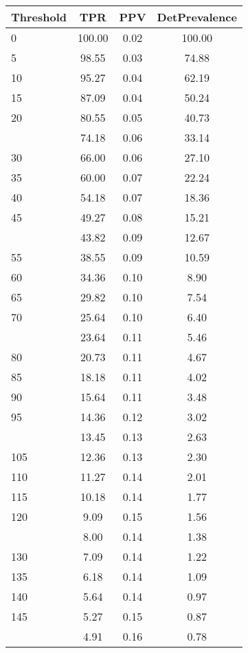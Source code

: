 \begin{table}[ht]
\centering
\begin{tabular}{lccc}
  \toprule
Threshold & TPR & PPV & DetPrevalence \\ 
  \midrule
0 & 100.00 & 0.02 & 100.00 \\ 
  5 & 98.55 & 0.03 & 74.88 \\ 
  10 & 95.27 & 0.04 & 62.19 \\ 
  15 & 87.09 & 0.04 & 50.24 \\ 
  20 & 80.55 & 0.05 & 40.73 \\ 
   \addlinespace
25 & 74.18 & 0.06 & 33.14 \\ 
  30 & 66.00 & 0.06 & 27.10 \\ 
  35 & 60.00 & 0.07 & 22.24 \\ 
  40 & 54.18 & 0.07 & 18.36 \\ 
  45 & 49.27 & 0.08 & 15.21 \\ 
   \addlinespace
50 & 43.82 & 0.09 & 12.67 \\ 
  55 & 38.55 & 0.09 & 10.59 \\ 
  60 & 34.36 & 0.10 & 8.90 \\ 
  65 & 29.82 & 0.10 & 7.54 \\ 
  70 & 25.64 & 0.10 & 6.40 \\ 
   \addlinespace
75 & 23.64 & 0.11 & 5.46 \\ 
  80 & 20.73 & 0.11 & 4.67 \\ 
  85 & 18.18 & 0.11 & 4.02 \\ 
  90 & 15.64 & 0.11 & 3.48 \\ 
  95 & 14.36 & 0.12 & 3.02 \\ 
   \addlinespace
100 & 13.45 & 0.13 & 2.63 \\ 
  105 & 12.36 & 0.13 & 2.30 \\ 
  110 & 11.27 & 0.14 & 2.01 \\ 
  115 & 10.18 & 0.14 & 1.77 \\ 
  120 & 9.09 & 0.15 & 1.56 \\ 
   \addlinespace
125 & 8.00 & 0.14 & 1.38 \\ 
  130 & 7.09 & 0.14 & 1.22 \\ 
  135 & 6.18 & 0.14 & 1.09 \\ 
  140 & 5.64 & 0.14 & 0.97 \\ 
  145 & 5.27 & 0.15 & 0.87 \\ 
   \addlinespace
150 & 4.91 & 0.16 & 0.78 \\ 

\end{tabular}
\end{table}
